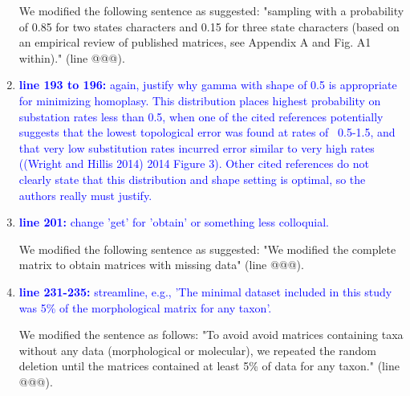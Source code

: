\documentclass[12pt,letterpaper]{article}
\begin{document}
\begin{enumerate}
We modified the following sentence as suggested: "sampling with a probability of 0.85 for two states characters and 0.15 for three state characters (based on an empirical review of published matrices, see Appendix A and Fig. A1 within)." (line @@@).

\item{\textcolor{blue}{\textbf{line 193 to 196:} again, justify why gamma with shape of 0.5 is appropriate for minimizing homoplasy. This distribution places highest probability on substation rates less than 0.5, when one of the cited references potentially suggests that the lowest topological error was found at rates of ~0.5-1.5, and that very low substitution rates incurred error similar to very high rates ((Wright and Hillis 2014) 2014 Figure 3). Other cited references do not clearly state that this distribution and shape setting is optimal, so the authors really must justify. }}


\item{\textcolor{blue}{\textbf{line 201:} change 'get' for 'obtain' or something less colloquial.}}

We modified the following sentence as suggested: "We modified the complete matrix to obtain matrices with missing data" (line @@@).

\item{\textcolor{blue}{\textbf{line 231-235:} streamline, e.g., 'The minimal dataset included in this study was 5\% of the morphological matrix for any taxon'.}}

We modified the sentence as follows: "To avoid avoid matrices containing taxa without any data (morphological or molecular), we repeated the random deletion until the matrices contained at least 5\% of data for any taxon." (line @@@).


\end{enumerate}
\end{document}
